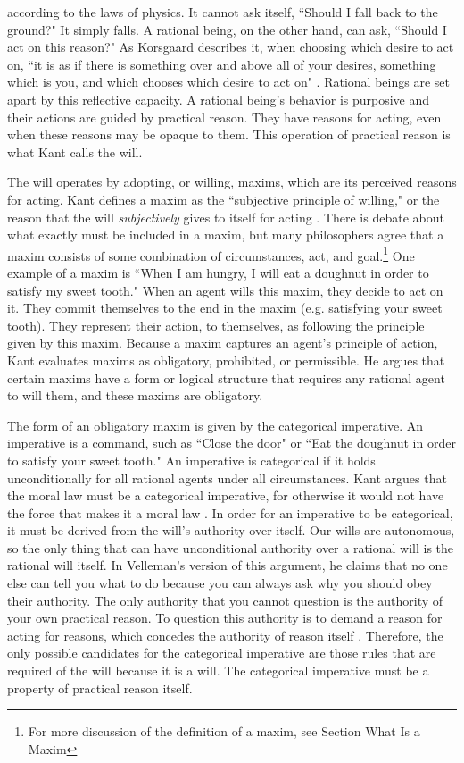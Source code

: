 \begin{isabellebody}
\begin{isamarkuptext}
according to the laws of physics. It cannot ask itself, ``Should I fall back to the ground?" 
It simply falls. A rational being, on the other hand, can ask, ``Should I act on this reason?" 
As Korsgaard describes it, when choosing which desire to act on, ``it is as if there is something over 
and above all of your desires, something which is you, and which chooses which desire to act on" \citep[100]{sources}. 
Rational beings are set apart by this reflective capacity. A rational being's behavior is purposive and 
their actions are guided by practical reason. They have reasons for acting, even when these reasons may be 
opaque to them. This operation of practical reason is what Kant calls the will. 

The will operates by adopting, or willing, maxims, which are its perceived reasons for acting. Kant defines a maxim as 
the ``subjective principle of willing," or the reason that the will \emph{subjectively} gives 
to itself for acting \citep[16 footnote 1]{groundwork}. There is debate about what exactly must be 
included in a maxim, but many philosophers agree that a maxim consists of some combination of circumstances, 
act, and goal.\footnote{For more discussion of the definition of a maxim, see Section What Is a Maxim}
One example of a maxim is ``When I am hungry, I will eat a doughnut in order to satisfy my sweet tooth." 
When an agent wills this maxim, they decide to act on it. They commit themselves to the end in the maxim 
(e.g. satisfying your sweet tooth). They represent their action, to themselves, as following the 
principle given by this maxim. Because a maxim captures an agent's principle of action, Kant evaluates
maxims as obligatory, prohibited, or permissible. He argues that certain maxims have a form or logical structure 
that requires any rational agent to will them, and these maxims are obligatory. 

The form of an obligatory maxim is given by the categorical imperative. 
An imperative is a command, such as ``Close the door" or ``Eat the doughnut in order to satisfy your 
sweet tooth." An imperative is categorical if it holds unconditionally for all rational agents under all 
circumstances. Kant argues that the moral law must be a categorical imperative, for otherwise it would 
not have the force that makes it a moral law \citep[5]{groundwork}. In order for an imperative to be 
categorical, it must be derived from the will's authority over itself. Our wills are autonomous, so 
the only thing that can have unconditional authority over a rational will is 
the rational will itself. In Velleman's version of this argument, he claims that no one else can tell you what 
to do because you can always ask why you 
should obey their authority. The only authority that you cannot question is the authority of your own 
practical reason. To question this authority is to demand a reason for acting for reasons, which 
concedes the authority of reason itself \citep[23]{velleman}. Therefore, the only possible candidates 
for the categorical imperative are those rules that are required of the will because it is a will. 
The categorical imperative must be a property of practical reason itself.


\end{isamarkuptext}
\end{isabellebody}
